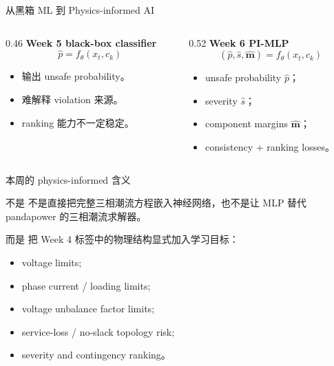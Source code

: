 \documentclass[aspectratio=169,11pt]{beamer}
\begin{document}
\begin{frame}{从黑箱 ML 到 Physics-informed AI}
\begin{columns}
\begin{column}{0.46\textwidth}
\textbf{Week 5 black-box classifier}
\[
\hat p=f_\theta(x_t,c_k)
\]
\begin{itemize}
  \item 输出 unsafe probability。
  \item 难解释 violation 来源。
  \item ranking 能力不一定稳定。
\end{itemize}
\end{column}
\begin{column}{0.52\textwidth}
\textbf{Week 6 PI-MLP}
\[
(\hat p,\hat s,\hat{\mathbf m})=f_\theta(x_t,c_k)
\]
\begin{itemize}
  \item unsafe probability $\hat p$；
  \item severity $\hat s$；
  \item component margins $\hat{\mathbf m}$；
  \item consistency + ranking losses。
\end{itemize}
\end{column}
\end{columns}
\end{frame}

\begin{frame}{本周的 physics-informed 含义}
\begin{alertblock}{不是}
不是直接把完整三相潮流方程嵌入神经网络，也不是让 MLP 替代 pandapower 的三相潮流求解器。
\end{alertblock}
\begin{block}{而是}
把 Week 4 标签中的物理结构显式加入学习目标：
\begin{itemize}
  \item voltage limits;
  \item phase current / loading limits;
  \item voltage unbalance factor limits;
  \item service-loss / no-slack topology risk;
  \item severity and contingency ranking。
\end{itemize}
\end{block}
\end{frame}
\end{document}
